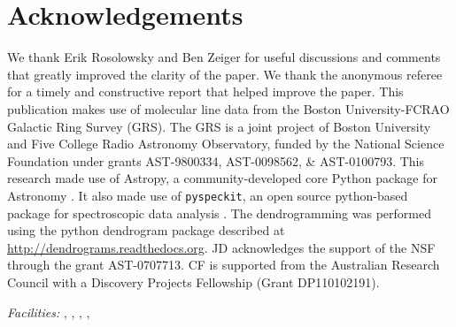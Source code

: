 \section{Acknowledgements}
We thank Erik Rosolowsky and Ben Zeiger for useful discussions and comments
that greatly improved the clarity of the paper.  We thank the anonymous referee
for a timely and constructive report that helped improve the paper.
This publication makes use of molecular line data from the Boston
University-FCRAO Galactic Ring Survey (GRS). The GRS is a joint project of
Boston University and Five College Radio Astronomy Observatory, funded by the
National Science Foundation under grants AST-9800334, AST-0098562, \&
AST-0100793.
This research made use of Astropy, a community-developed core Python package
for Astronomy \citep[\url{http://astropy.org}; ][]{Astropy2013a}.  It also made use of \texttt{pyspeckit}, an
open source python-based package for spectroscopic data analysis
\citep[\url{http://pyspeckit.readthedocs.org}; ][]{Ginsburg2011c}.
The dendrogramming was performed using the python dendrogram package described at
\url{http://dendrograms.readthedocs.org}.
JD acknowledges the support of the NSF through the grant AST-0707713.
CF is supported from the Australian Research Council with a Discovery Projects Fellowship (Grant DP110102191).



{\it Facilities:} , , ,
, 



% 
% 

